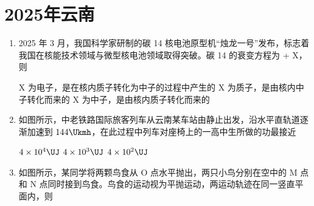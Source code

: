 \documentclass[\gkver]{gaokaozhenti}
\begin{document}
\chapter{2025年云南}

\begin{enumerate}
\item
2025 年 3 月，我国科学家研制的碳 14 核电池原型机“烛龙一号”发布，标志着我国在核能技术领域与微型核电池领域取得突破。碳 14 的衰变方程为  + X，则

{X 为电子，是在核内质子转化为中子的过程中产生的}
{X 为质子，是由核内中子转化而来的}
{X 为中子，是由核内质子转化而来的}


\item
如图所示，中老铁路国际旅客列车从云南某车站由静止出发，沿水平直轨道逐渐加速到 $144 \Ukmh$，在此过程中列车对座椅上的一高中生所做的功最接近


{$4 \times 10^{4} \UJ$}
{$4 \times 10^{3} \UJ$}
{$4 \times 10^{2} \UJ$}


\item
如图所示，某同学将两颗鸟食从 O 点水平抛出，两只小鸟分别在空中的 M 点和 N 点同时接到鸟食。鸟食的运动视为平抛运动，两运动轨迹在同一竖直平面内，则



\end{enumerate}
\end{document}
